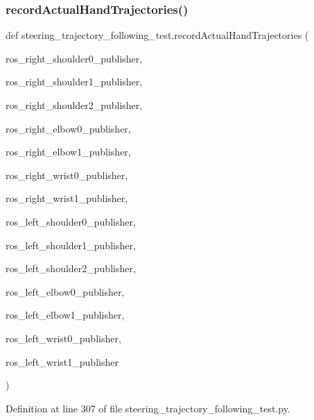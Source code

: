 \subsubsection{\texorpdfstring{recordActualHandTrajectories()}{recordActualHandTrajectories()}}
{\footnotesize\ttfamily def steering\+\_\+trajectory\+\_\+following\+\_\+test.\+record\+Actual\+Hand\+Trajectories (\begin{DoxyParamCaption}\item[{}]{ros\+\_\+right\+\_\+shoulder0\+\_\+publisher,  }\item[{}]{ros\+\_\+right\+\_\+shoulder1\+\_\+publisher,  }\item[{}]{ros\+\_\+right\+\_\+shoulder2\+\_\+publisher,  }\item[{}]{ros\+\_\+right\+\_\+elbow0\+\_\+publisher,  }\item[{}]{ros\+\_\+right\+\_\+elbow1\+\_\+publisher,  }\item[{}]{ros\+\_\+right\+\_\+wrist0\+\_\+publisher,  }\item[{}]{ros\+\_\+right\+\_\+wrist1\+\_\+publisher,  }\item[{}]{ros\+\_\+left\+\_\+shoulder0\+\_\+publisher,  }\item[{}]{ros\+\_\+left\+\_\+shoulder1\+\_\+publisher,  }\item[{}]{ros\+\_\+left\+\_\+shoulder2\+\_\+publisher,  }\item[{}]{ros\+\_\+left\+\_\+elbow0\+\_\+publisher,  }\item[{}]{ros\+\_\+left\+\_\+elbow1\+\_\+publisher,  }\item[{}]{ros\+\_\+left\+\_\+wrist0\+\_\+publisher,  }\item[{}]{ros\+\_\+left\+\_\+wrist1\+\_\+publisher }\end{DoxyParamCaption})}



Definition at line 307 of file steering\+\_\+trajectory\+\_\+following\+\_\+test.\+py.


